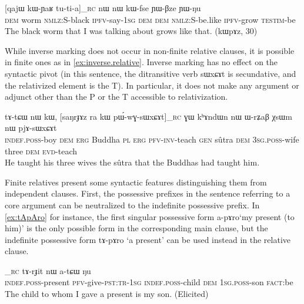 \documentclass[oldfontcommands,oneside,a4paper,11pt]{article}
\newcommand{\ipa}[1]{{\phon #1}} %
\newcommand{\topic}{\textsc{dem}}
\begin{document}
     \begin{exe}
   \ex \label{ex:tutianw}
 \gll \ipa{nɯ}  	[\ipa{qajɯ}  	\ipa{kɯ-ɲaʁ}  	\ipa{tu-ti-a}]_{\textsc{rc}}  	\ipa{nɯ}  	\ipa{nɯ}  	\ipa{kɯ-fse}  	\ipa{ɲɯ-βze}  	\ipa{ɲɯ-ŋu}  \\
\textsc{dem} worm \textsc{nmlz:S}-black \textsc{ipfv}-say-\textsc{1sg} \textsc{dem}  \textsc{dem} \textsc{nmlz:S}-be.like \textsc{ipfv}-grow \textsc{testim}-be \\
\glt The black worm that I was talking about grows like that. (\ipa{kɯpɤz}, 30)
\end{exe}

While inverse marking does not occur in non-finite relative clauses, it is possible in finite ones as in \ref{ex:inverse.relative}. Inverse marking has no effect on the syntactic pivot (in this sentence, the ditransitive verb \ipa{sɯxɕɤt} is secundative, and the relativized element is the T). In particular, it does not make any argument or adjunct other than the P or the T accessible to relativization.

     \begin{exe}
   \ex \label{ex:inverse.relative}
 \gll
\ipa{tɤ-tɕɯ}  	\ipa{nɯ}  	\ipa{kɯ,}  	[\ipa{saŋrɟɤz}  	\ipa{ra}  	\ipa{kɯ}  	\ipa{pɯ́-wɣ-sɯxɕɤt}]_{\textsc{rc}}  	\ipa{ɣɯ}  	\ipa{kʰɤndɯn}  	\ipa{nɯ}  	\ipa{ɯ-rʑaβ}  	\ipa{χsɯm}  	\ipa{nɯ}  	\ipa{pjɤ-sɯxɕɤt}  \\
\textsc{indef.poss}-boy \textsc{dem} \textsc{erg} Buddha \textsc{pl} \textsc{erg} \textsc{pfv-inv}-teach   \textsc{gen} sûtra \textsc{dem} \textsc{3sg.poss}-wife three \textsc{dem} \textsc{evd}-teach \\
\glt He taught his three wives the sûtra that the Buddhas had taught him.
\end{exe}


Finite relatives present some syntactic features distinguishing them from independent clauses. First, the possessive prefixes in the sentence referring to a core argument can be neutralized to the indefinite possessive prefix. In \ref{ex:tApAro} for instance, the first singular possessive form \ipa{a-pɤro}`my present (to him)' is the only possible form in the corresponding main clause, but the indefinite possessive form \ipa{tɤ-pɤro} `a present' can be used instead in the relative clause.

		\begin{exe}
\ex \label{ex:tApAro}
\gll
	[\ipa{tɤ-pɤro}  	\ipa{nɯ-mbi-t-a}]_{\textsc{rc}}  	\ipa{tɤ-rɟit}  	\ipa{nɯ}  	\ipa{a-tɕɯ}  	\ipa{ŋu}   \\
	\textsc{indef.poss}-present \textsc{pfv}-give-\textsc{pst:tr-1sg} 	\textsc{indef.poss}-child \topic{} \textsc{1sg.poss}-son \textsc{fact}:be \\
\glt The child to whom I gave a present is my son. (Elicited)
 	  \end{exe} 
 	  
\end{document}
